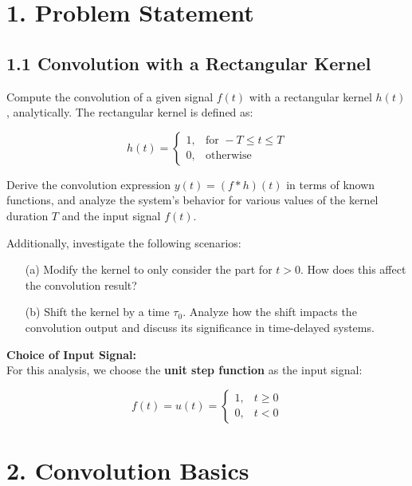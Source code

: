 \section*{1. Problem Statement}

\subsection*{1.1 Convolution with a Rectangular Kernel}
Compute the convolution of a given signal \( f(t) \) with a rectangular kernel \( h(t) \), analytically. The rectangular kernel is defined as:

\begin{equation}
h(t) = 
\begin{cases} 
1, & \text{for } -T \leq t \leq T \\
0, & \text{otherwise}
\end{cases}
\end{equation}

Derive the convolution expression \( y(t) = (f * h)(t) \) in terms of known functions, and analyze the system's behavior for various values of the kernel duration \( T \) and the input signal \( f(t) \).

Additionally, investigate the following scenarios:

\begin{enumerate}
    \item[(a)] Modify the kernel to only consider the part for \( t > 0 \). How does this affect the convolution result?
    \item[(b)] Shift the kernel by a time \( \tau_0 \). Analyze how the shift impacts the convolution output and discuss its significance in time-delayed systems.
\end{enumerate}

\textbf{Choice of Input Signal:}\\
For this analysis, we choose the \textbf{unit step function} as the input signal:

\begin{equation}
f(t) = u(t) = 
\begin{cases} 
1, & t \geq 0 \\
0, & t < 0 
\end{cases}
\end{equation}

\section*{2. Convolution Basics}

